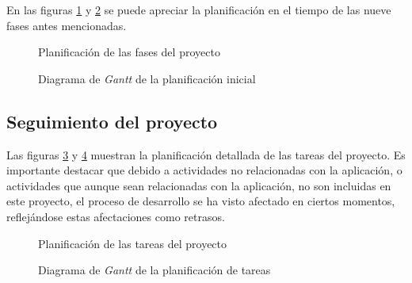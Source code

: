        En las figuras \ref{fig:gantt-initial-tasks} y \ref{fig:gantt-initial-diagram} se puede apreciar la planificación en el tiempo de las nueve fases antes mencionadas.
        
        \begin{figure}[H]
        \centering
            \caption{Planificación de las fases del proyecto}
            \label{fig:gantt-initial-tasks}
        \end{figure}
        
        \begin{figure}[H]
        \centering
            \caption{Diagrama de \textit{Gantt} de la planificación inicial}
            \label{fig:gantt-initial-diagram}
        \end{figure}
        
    \subsection{Seguimiento del proyecto}
        
        Las figuras \ref{fig:gantt-followup-tasks} y \ref{fig:gantt-followup-diagram} muestran la planificación detallada de las tareas del proyecto. Es importante destacar que debido a actividades no relacionadas con la aplicación, o actividades que aunque sean relacionadas con la aplicación, no son incluidas en este proyecto, el proceso de desarrollo se ha visto afectado en ciertos momentos, reflejándose estas afectaciones como retrasos.
        
        \begin{figure}[H]
        \centering
            \caption{Planificación de las tareas del proyecto}
            \label{fig:gantt-followup-tasks}
        \end{figure}
    
        \begin{figure}[H]
        \centering
            \caption{Diagrama de \textit{Gantt} de la planificación de tareas}
            \label{fig:gantt-followup-diagram}
        \end{figure}